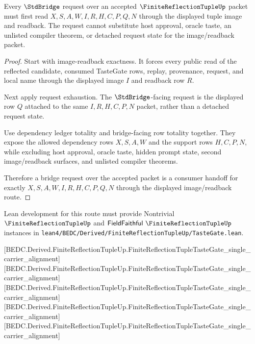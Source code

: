 \begin{theorem}
\label{thm:finite-hist-locality-packet-bridge-request-boundary}
Every $\StdBridge$ request over an accepted $\FiniteReflectionTupleUp$ packet must first read $X,S,A,W,I,R,H,C,P,Q,N$ through the displayed tuple image and readback. The request cannot substitute host approval, oracle taste, an unlisted compiler theorem, or detached request state for the image/readback packet.
\end{theorem}
\begin{proof}
Start with image-readback exactness. It forces every public read of the reflected candidate, consumed TasteGate rows, replay, provenance, request, and local name through the displayed image $I$ and readback row $R$.

Next apply request exhaustion. The $\StdBridge$-facing request is the displayed row $Q$ attached to the same $I,R,H,C,P,N$ packet, rather than a detached request state.

Use dependency ledger totality and bridge-facing row totality together. They expose the allowed dependency rows $X,S,A,W$ and the support rows $H,C,P,N$, while excluding host approval, oracle taste, hidden prompt state, second image/readback surfaces, and unlisted compiler theorems.

Therefore a bridge request over the accepted packet is a consumer handoff for exactly $X,S,A,W,I,R,H,C,P,Q,N$ through the displayed image/readback route.
\end{proof}



Lean development for this route must provide Nontrivial $\FiniteReflectionTupleUp$ and $\mathsf{FieldFaithful}\ \FiniteReflectionTupleUp$ instances in \texttt{lean4/BEDC/Derived/FiniteReflectionTupleUp/TasteGate.lean}.

[BEDC.Derived.FiniteReflectionTupleUp.FiniteReflectionTupleTasteGate\_single\_carrier\_alignment]
[BEDC.Derived.FiniteReflectionTupleUp.FiniteReflectionTupleTasteGate\_single\_carrier\_alignment]
[BEDC.Derived.FiniteReflectionTupleUp.FiniteReflectionTupleTasteGate\_single\_carrier\_alignment]
[BEDC.Derived.FiniteReflectionTupleUp.FiniteReflectionTupleTasteGate\_single\_carrier\_alignment]
[BEDC.Derived.FiniteReflectionTupleUp.FiniteReflectionTupleTasteGate\_single\_carrier\_alignment]

